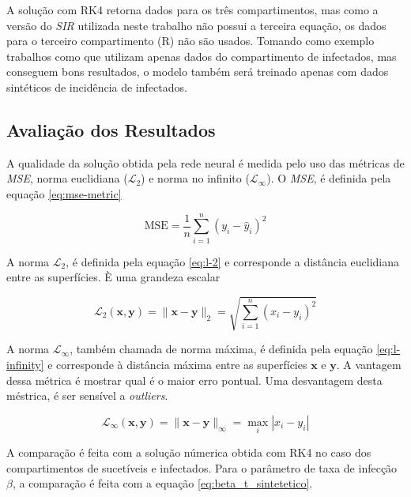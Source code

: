 A solução com RK4 retorna dados para os três compartimentos, mas como a versão
do \textit{SIR} utilizada neste trabalho não possui a terceira equação, os 
dados para o terceiro compartimento (R) não são usados. Tomando como exemplo
trabalhos como \cite{han-etal:24-prim-artigo-alemanha} que utilizam apenas
dados do compartimento de infectados, mas conseguem bons resultados, o modelo
também será treinado apenas com dados sintéticos de incidência de infectados.  

\subsection{Avaliação dos Resultados}

A qualidade da solução obtida pela rede neural é medida pelo uso das métricas
de \textit{MSE}, norma euclidiana ($\mathcal{L}_2$) e norma no infinito 
($\mathcal{L}_{\infty}$). 
O \textit{MSE}, é definida pela equação \ref{eq:mse-metric}  

\begin{equation}\label{eq:mse-metric}
    \text{MSE} = \frac{1}{n} \sum_{i=1}^{n} (y_i - \hat{y}_i)^2
\end{equation}

A norma $\mathcal{L}_2$, é definida pela equação \ref{eq:l-2} e corresponde
a distância euclidiana entre as superfícies. È uma grandeza escalar  

\begin{equation}\label{eq:l-2}
    \mathcal{L}_2(\mathbf{x}, \mathbf{y}) = \|\mathbf{x} - \mathbf{y}\|_2 = \sqrt{\sum_{i=1}^{n} (x_i - y_i)^2}
\end{equation}

A norma $\mathcal{L}_{\infty}$, também chamada de norma máxima, é definida 
pela equação \ref{eq:l-infinity} e corresponde à distância máxima entre as
superfícies $\mathbf{x}$ e $\mathbf{y}$. A vantagem dessa métrica é mostrar
qual é o maior erro pontual. Uma desvantagem desta méstrica, é ser sensível 
a \textit{outliers}.

\begin{equation}\label{eq:l-infinity}
    \mathcal{L}_\infty(\mathbf{x}, \mathbf{y}) = \|\mathbf{x} - \mathbf{y}\|_\infty = \max_{i} |x_i - y_i|
\end{equation}

A comparação é feita com a solução númerica obtida com RK4 no caso dos 
compartimentos de sucetíveis e infectados. Para o parâmetro de taxa de infecção
$\beta$, a comparação é feita com a equação \ref{eq:beta_t_sintetetico}.

